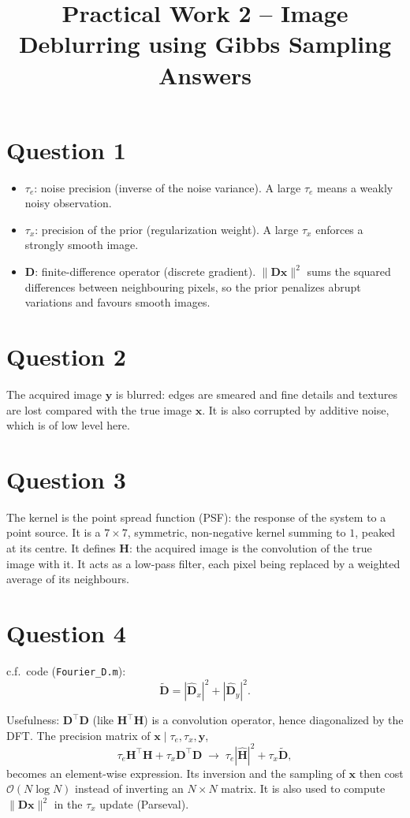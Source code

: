 \documentclass[11pt,a4paper]{article}
\title{Practical Work 2 -- Image Deblurring using Gibbs Sampling\\Answers}
\author{}
\date{}
\newcommand{\Dt}{\tilde{\mathbf D}}
\begin{document}
\maketitle

\section*{Question 1}
\begin{itemize}
  \item $\tau_e$: noise precision (inverse of the noise variance). A large $\tau_e$ means a weakly noisy observation.
  \item $\tau_x$: precision of the prior (regularization weight). A large $\tau_x$ enforces a strongly smooth image.
  \item $\mathbf D$: finite-difference operator (discrete gradient). $\|\mathbf D\mathbf x\|^2$ sums the squared differences between neighbouring pixels, so the prior penalizes abrupt variations and favours smooth images.
\end{itemize}

\section*{Question 2}
The acquired image $\mathbf y$ is blurred: edges are smeared and fine details and textures are lost compared with the true image $\mathbf x$. It is also corrupted by additive noise, which is of low level here.

\section*{Question 3}
The kernel is the point spread function (PSF): the response of the system to a point source. It is a $7\times 7$, symmetric, non-negative kernel summing to $1$, peaked at its centre. It defines $\mathbf H$: the acquired image is the convolution of the true image with it. It acts as a low-pass filter, each pixel being replaced by a weighted average of its neighbours.

\section*{Question 4}
c.f.\ code (\texttt{Fourier\_D.m}):
\[
\Dt = |\widehat{\mathbf D}_x|^2 + |\widehat{\mathbf D}_y|^2 .
\]

Usefulness: $\mathbf D^\top\mathbf D$ (like $\mathbf H^\top\mathbf H$) is a convolution operator, hence diagonalized by the DFT. The precision matrix of $\mathbf x \mid \tau_e,\tau_x,\mathbf y$,
\[
\tau_e\mathbf H^\top\mathbf H + \tau_x\mathbf D^\top\mathbf D \;\longrightarrow\; \tau_e|\widehat{\mathbf H}|^2 + \tau_x\Dt ,
\]
becomes an element-wise expression. Its inversion and the sampling of $\mathbf x$ then cost $\mathcal O(N\log N)$ instead of inverting an $N\times N$ matrix. It is also used to compute $\|\mathbf D\mathbf x\|^2$ in the $\tau_x$ update (Parseval).
\end{document}
